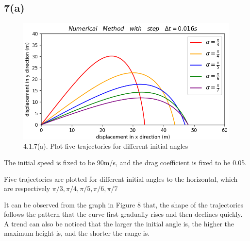 \documentclass{article}
\begin{document}
\subsection*{7(a)}
\begin{figure}[H]
  \centering
  \includegraphics[scale=0.6]{./graphs/project4.1.7(a).png}
  \caption{4.1.7(a). Plot five trajectories for different initial angles}
\end{figure}
The initial speed is fixed to be 90m/s, and the drag coefficient is fixed to be 0.05.

Five trajectories are plotted for different initial angles to the horizontal, which are respectively {$\pi/3,\pi/4,\pi/5,\pi/6,\pi/7$}

It can be observed from the graph in Figure 8 that, the shape of the trajectories follows the pattern that the curve first gradually rises and then declines quickly.
A trend can also be noticed that the larger the initial angle is, the higher the maximum height is, and the shorter the range is.

\vspace{0.01\textheight}
\end{document}
